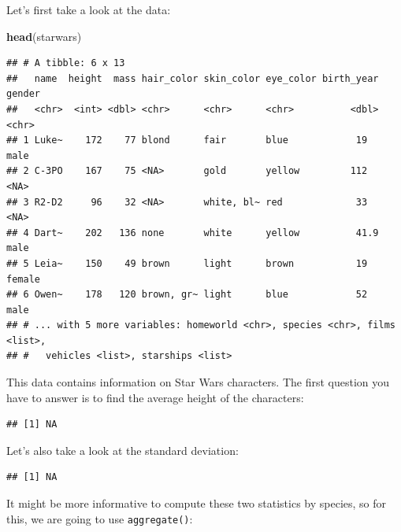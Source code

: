 \documentclass[]{gitbook}
\newenvironment{Shaded}{\begin{snugshade}}{\end{snugshade}}
\newcommand{\KeywordTok}[1]{\textcolor[rgb]{0.13,0.29,0.53}{\textbf{#1}}}
\newcommand{\NormalTok}[1]{#1}
\newcommand{\OperatorTok}[1]{\textcolor[rgb]{0.81,0.36,0.00}{\textbf{#1}}}
\theoremstyle{definition}
\theoremstyle{definition}
\theoremstyle{definition}
\theoremstyle{remark}
\begin{document}
Let's first take a look at the data:

\begin{Shaded}
\begin{Highlighting}[]
\KeywordTok{head}\NormalTok{(starwars)}
\end{Highlighting}
\end{Shaded}

\begin{verbatim}
## # A tibble: 6 x 13
##   name  height  mass hair_color skin_color eye_color birth_year gender
##   <chr>  <int> <dbl> <chr>      <chr>      <chr>          <dbl> <chr> 
## 1 Luke~    172    77 blond      fair       blue            19   male  
## 2 C-3PO    167    75 <NA>       gold       yellow         112   <NA>  
## 3 R2-D2     96    32 <NA>       white, bl~ red             33   <NA>  
## 4 Dart~    202   136 none       white      yellow          41.9 male  
## 5 Leia~    150    49 brown      light      brown           19   female
## 6 Owen~    178   120 brown, gr~ light      blue            52   male  
## # ... with 5 more variables: homeworld <chr>, species <chr>, films <list>,
## #   vehicles <list>, starships <list>
\end{verbatim}

This data contains information on Star Wars characters. The first
question you have to answer is to find the average height of the
characters:

\begin{Shaded}
\end{Shaded}

\begin{verbatim}
## [1] NA
\end{verbatim}

Let's also take a look at the standard deviation:

\begin{Shaded}
\end{Shaded}

\begin{verbatim}
## [1] NA
\end{verbatim}

It might be more informative to compute these two statistics by species,
so for this, we are going to use \texttt{aggregate()}:
\end{document}
